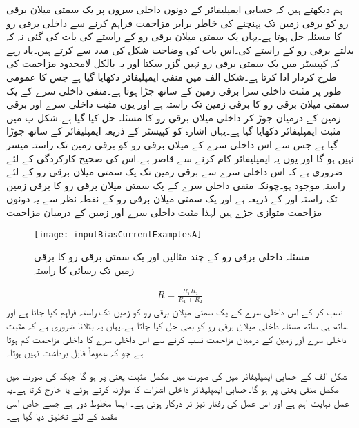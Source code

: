 ہم دیکھتے ہیں کہ حسابی ایمپلیفائر کے دونوں داخلی سروں پر یک سمتی میلان برقی رو کو برقی زمین تک پہنچنے کی خاطر برابر مزاحمت فراہم کرنے سے داخلی برقی رو کا مسئلہ حل ہوتا ہے۔یہاں یک سمتی میلان برقی رو کے راستے کی بات کی گئی نہ کہ بدلتے برقی رو کے راستے کی۔اس بات کی وضاحت شکل     کی مدد سے کرتے ہیں۔یاد رہے کہ کپیسٹر میں یک سمتی برقی رو نہیں گزر سکتا اور یہ بالکل لامحدود مزاحمت کی طرح کردار ادا کرتا ہے۔شکل   الف میں منفی ایمپلیفائر دکھایا گیا ہے جس کا عمومی طور پر مثبت داخلی سرا برقی زمین کے ساتھ جڑا ہوتا ہے۔منفی داخلی سرے  کے یک سمتی میلان  برقی رو کا برقی زمین تک راستہ  ہے اور یوں مثبت داخلی سرے  اور برقی زمین کے درمیان  جوڑ کر داخلی میلان برقی رو کا مسئلہ حل کیا گیا ہے۔شکل  ب میں مثبت ایمپلیفائر دکھایا گیا ہے۔یہاں اشارہ کو کپیسٹر کے ذریعہ ایمپلیفائر کے ساتھ جوڑا گیا ہے جس سے اس داخلی سرے  کے میلان برقی رو کو برقی زمین تک راستہ میسر نہیں ہو گا اور یوں یہ ایمپلیفائر کام کرنے سے قاصر ہے۔اس کی صحیح کارکردگی کے لئے ضروری ہے کہ اس داخلی سرے  سے برقی زمین تک یک سمتی میلان برقی رو کے لئے راستہ موجود ہو۔چونکہ منفی  داخلی سرے  کے یک سمتی میلان برقی رو کا برقی زمین تک راستہ  اور  کے ذریعہ ہے اور یک سمتی میلان برقی رو کے نقطہ نظر سے یہ دونوں مزاحمت متوازی جڑے ہیں لہٰذا مثبت  داخلی سرے  اور زمین کے درمیان مزاحمت
\begin{figure}
\centering
\texttt{[image: inputBiasCurrentExamplesA]}
\caption{مسئلہ داخلی برقی رو کے چند مثالیں اور یک سمتی برقی رو کا برقی زمین تک رسائی کا راستہ}
\label{شکل_مسئلہ_داخلی_برقی_رو_کے_چند_مثال}
\end{figure}
%
\begin{align*}
R=\frac{R_1 R_2}{R_1+R_2}
\end{align*}
نسب کر کے اس داخلی سرے  کے یک سمتی میلان برقی رو کو زمین تک راستہ فراہم کیا جاتا ہے اور ساتھ ہی ساتھ مسئلہ داخلی میلان برقی رو کو بھی حل کیا جاتا ہے۔یہاں یہ بتلانا ضروری ہے کہ مثبت داخلی سرے  اور زمین کے درمیان مزاحمت  نسب کرنے سے اس داخلی سرے  کا داخلی مزاحمت کم ہوتا ہے جو کہ عموماً قابل برداشت نہیں ہوتا۔



شکل  الف کے حسابی ایمپلیفائر میں  کی صورت میں  مکمل مثبت یعنی  پر ہو گا جبکہ  کی صورت میں  مکمل منفی یعنی  پر ہو گا۔حسابی ایمپلیفائر داخلی اشارات کا موازنہ کرتے ہوئے  یا   خارج کرتا ہے۔یہ عمل نہایت اہم ہے اور اس عمل کی رفتار تیز تر درکار ہوتی ہے۔ ایسا مخلوط دور ہے جسے خاص اسی مقصد کے لئے تخلیق دیا گیا ہے۔


